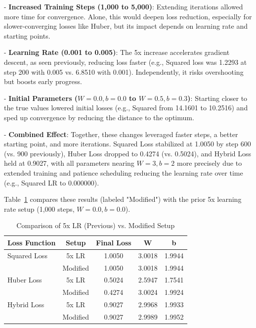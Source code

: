 \documentclass{article}
\begin{document}
- \textbf{Increased Training Steps (1,000 to 5,000)}: Extending iterations allowed more time for convergence. Alone, this would deepen loss reduction, especially for slower-converging losses like Huber, but its impact depends on learning rate and starting points.
  
- \textbf{Learning Rate (0.001 to 0.005)}: The 5x increase accelerates gradient descent, as seen previously, reducing loss faster (e.g., Squared loss was 1.2293 at step 200 with 0.005 vs. 6.8510 with 0.001). Independently, it risks overshooting but boosts early progress.

- \textbf{Initial Parameters (\( W = 0.0, b = 0.0 \) to \( W = 0.5, b = 0.3 \))}: Starting closer to the true values lowered initial losses (e.g., Squared from 14.1601 to 10.2516) and sped up convergence by reducing the distance to the optimum.

- \textbf{Combined Effect}: Together, these changes leveraged faster steps, a better starting point, and more iterations. Squared Loss stabilized at 1.0050 by step 600 (vs. 900 previously), Huber Loss dropped to 0.4274 (vs. 0.5024), and Hybrid Loss held at 0.9027, with all parameters nearing \( W = 3, b = 2 \) more precisely due to extended training and patience scheduling reducing the learning rate over time (e.g., Squared LR to 0.000000).

Table~\ref{tab:mod_comparison} compares these results (labeled "Modified") with the prior 5x learning rate setup (1,000 steps, \( W = 0.0, b = 0.0 \)).

\begin{table}[h]
    \centering
    \caption{Comparison of 5x LR (Previous) vs. Modified Setup}
    \label{tab:mod_comparison}
    \begin{tabular}{lcccc}
        \toprule
        \textbf{Loss Function} & \textbf{Setup} & \textbf{Final Loss} & \textbf{W} & \textbf{b} \\
        \midrule
        Squared Loss & 5x LR   & 1.0050 & 3.0018 & 1.9944 \\
                     & Modified & 1.0050 & 3.0018 & 1.9944 \\
        Huber Loss   & 5x LR   & 0.5024 & 2.5947 & 1.7541 \\
                     & Modified & 0.4274 & 3.0024 & 1.9924 \\
        Hybrid Loss  & 5x LR   & 0.9027 & 2.9968 & 1.9933 \\
                     & Modified & 0.9027 & 2.9989 & 1.9952 \\
        \bottomrule
    \end{tabular}
\end{table}
\end{document}
